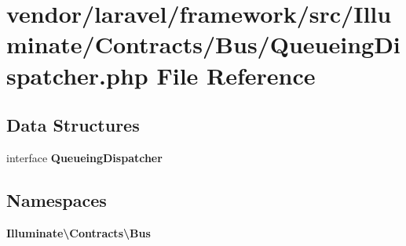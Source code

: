 \section{vendor/laravel/framework/src/\+Illuminate/\+Contracts/\+Bus/\+Queueing\+Dispatcher.php File Reference}
\label{_queueing_dispatcher_8php}
\subsection*{Data Structures}
\begin{DoxyCompactItemize}
\item 
interface {\bf Queueing\+Dispatcher}
\end{DoxyCompactItemize}
\subsection*{Namespaces}
\begin{DoxyCompactItemize}
\item 
 {\bf Illuminate\textbackslash{}\+Contracts\textbackslash{}\+Bus}
\end{DoxyCompactItemize}
